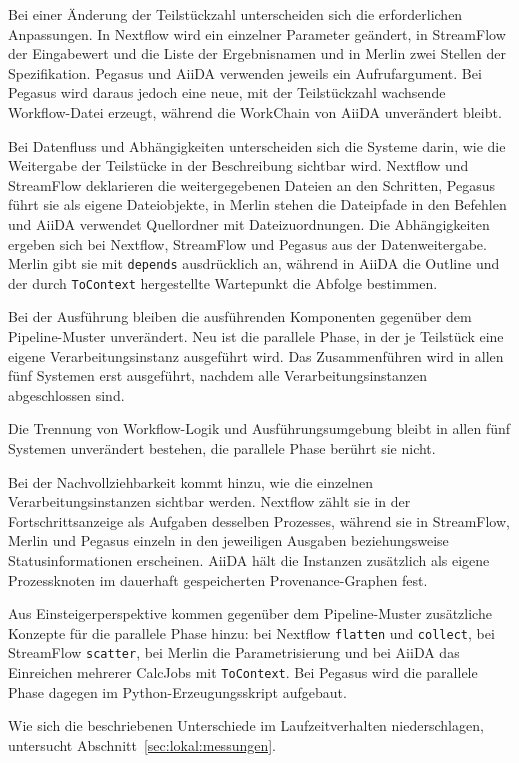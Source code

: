 Bei einer Änderung der Teilstückzahl unterscheiden sich die
erforderlichen Anpassungen. In Nextflow wird ein einzelner Parameter
geändert, in StreamFlow der Eingabewert und die Liste der
Ergebnisnamen und in Merlin zwei Stellen der Spezifikation. Pegasus
und AiiDA verwenden jeweils ein Aufrufargument. Bei Pegasus wird
daraus jedoch eine neue, mit der Teilstückzahl wachsende
Workflow-Datei erzeugt, während die WorkChain von AiiDA unverändert
bleibt.

Bei Datenfluss und Abhängigkeiten unterscheiden sich die Systeme
darin, wie die Weitergabe der Teilstücke in der Beschreibung
sichtbar wird. Nextflow und StreamFlow deklarieren die
weitergegebenen Dateien an den Schritten, Pegasus führt sie als
eigene Dateiobjekte, in Merlin stehen die Dateipfade in den
Befehlen und AiiDA verwendet Quellordner mit Dateizuordnungen. Die
Abhängigkeiten ergeben sich bei Nextflow, StreamFlow und Pegasus aus
der Datenweitergabe. Merlin gibt sie mit \texttt{depends}
ausdrücklich an, während in AiiDA die Outline und der durch
\texttt{ToContext} hergestellte Wartepunkt die Abfolge bestimmen.

Bei der Ausführung bleiben die ausführenden Komponenten gegenüber
dem Pipeline-Muster unverändert. Neu ist die parallele Phase, in
der je Teilstück eine eigene Verarbeitungsinstanz ausgeführt wird.
Das Zusammenführen wird in allen fünf Systemen erst ausgeführt,
nachdem alle Verarbeitungsinstanzen abgeschlossen sind.

Die Trennung von Workflow-Logik und Ausführungsumgebung bleibt in
allen fünf Systemen unverändert bestehen, die parallele Phase
berührt sie nicht.

Bei der Nachvollziehbarkeit kommt hinzu, wie die einzelnen
Verarbeitungsinstanzen sichtbar werden. Nextflow zählt sie in der
Fortschrittsanzeige als Aufgaben desselben Prozesses, während sie in
StreamFlow, Merlin und Pegasus einzeln in den jeweiligen Ausgaben
beziehungsweise Statusinformationen erscheinen. AiiDA hält die
Instanzen zusätzlich als eigene Prozessknoten im dauerhaft
gespeicherten Provenance-Graphen fest.

Aus Einsteigerperspektive kommen gegenüber dem Pipeline-Muster
zusätzliche Konzepte für die parallele Phase hinzu: bei Nextflow
\texttt{flatten} und \texttt{collect}, bei StreamFlow
\texttt{scatter}, bei Merlin die Parametrisierung und bei AiiDA das
Einreichen mehrerer CalcJobs mit \texttt{ToContext}. Bei Pegasus
wird die parallele Phase dagegen im Python-Erzeugungsskript
aufgebaut.

Wie sich die beschriebenen Unterschiede im
Laufzeitverhalten niederschlagen, untersucht
Abschnitt~\ref{sec:lokal:messungen}.

